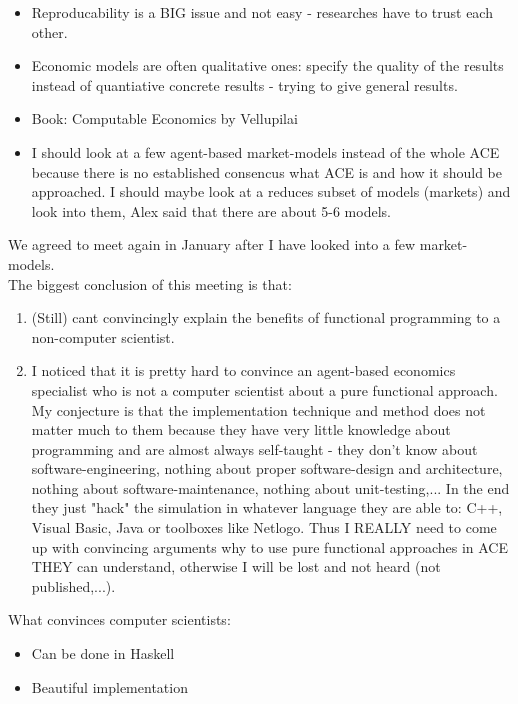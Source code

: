 \begin{itemize}
\item Reproducability is a BIG issue and not easy - researches have to trust each other.
\item Economic models are often qualitative ones: specify the quality of the results instead of quantiative concrete results - trying to give general results.
\item Book: Computable Economics by Vellupilai
\item I should look at a few agent-based market-models instead of the whole ACE because there is no established consencus what ACE is and how it should be approached. I should maybe look at a reduces subset of models (markets) and look into them, Alex said that there are about 5-6 models.
\end{itemize}

We agreed to meet again in January after I have looked into a few market-models. \\

The biggest conclusion of this meeting is that:
 
\begin{enumerate}
\item (Still) cant convincingly explain the benefits of functional programming to a non-computer scientist.
\item I noticed that it is pretty hard to convince an agent-based economics specialist who is not a computer scientist about a pure functional approach. My conjecture is that the implementation technique and method does not matter much to them because they have very little knowledge about programming and are almost always self-taught - they don't know about software-engineering, nothing about proper software-design and architecture, nothing about software-maintenance, nothing about unit-testing,... In the end they just "hack" the simulation in whatever language they are able to: C++, Visual Basic, Java or toolboxes like Netlogo. Thus I REALLY need to come up with convincing arguments why to use pure functional approaches in ACE THEY can understand, otherwise I will be lost and not heard (not published,...).
\end{enumerate}

What convinces computer scientists:
\begin{itemize}
\item Can be done in Haskell
\item Beautiful implementation 
\end{itemize}

